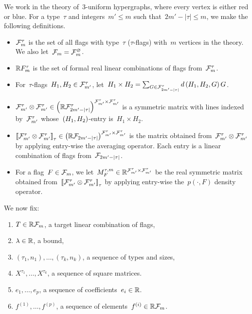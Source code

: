 \documentclass[11pt,a4paper,reqno]{amsart}
\begin{document}
We work in the theory of~$3$-uniform hypergraphs, where every vertex is either red or
blue. For a type~$\tau$ and integers~$m' \leq m$ such
that~$2m' - \left|\tau\right| \leq m$, we make the following definitions.
\begin{itemize}
\item ${\mathcal F}_m^\tau$ is the set of all flags with type~$\tau$ ($\tau$-flags) with~$m$ vertices in
  the theory. We also let~${\mathcal F}_m = {\mathcal F}_m^\varnothing$.
\item ${\mathbb R} F_m^\tau$ is the set of formal real linear combinations of flags
  from~${\mathcal F}_m^{\tau}$.
\item For~$\tau$-flags~$H_1, H_2 \in {\mathcal F}_{m'}^{\tau}$,
  let~$H_1 \times H_2 = \sum_{G \in {\mathcal F}_{2m' - \left| \tau \right|}^\tau} d\left(H_1, H_2, G\right) G$.
\item
  ${\mathcal F}_{m'}^{\tau} \otimes {\mathcal F}_{m'}^{\tau} \in \left({\mathbb R} {\mathcal F}_{2m' -
      \left|\tau\right|}^\tau\right)^{{\mathcal F}_{m'}^\tau \times {\mathcal F}_{m'}^\tau}$ is a symmetric matrix with lines
  indexed by~${\mathcal F}_{m'}^{\tau}$ whose~$\left(H_1, H_2\right)$-entry is~$H_1 \times H_2$.
\item
  $\left\llbracket {\mathcal F}_{m'}^{\tau} \otimes {\mathcal F}_{m'}^{\tau} \right\rrbracket_{\tau} \in \left({\mathbb R} {\mathcal F}_{2m' -
      \left|\tau\right|}\right)^{{\mathcal F}_{m'}^\tau \times {\mathcal F}_{m'}^\tau}$ is the matrix obtained
  from~${\mathcal F}_{m'}^{\tau} \otimes {\mathcal F}_{m'}^{\tau}$ by applying entry-wise the averaging
  operator. Each entry is a linear combination of flags
  from~${\mathcal F}_{2m' - \left|\tau\right|}$.
\item For a flag~$F \in {\mathcal F}_m$, we
  let~$M_F^{\tau, m} \in {\mathbb R}^{{\mathcal F}_{m'}^\tau \times {\mathcal F}_{m'}^\tau}$ be the real symmetric matrix
  obtained from~$\left\llbracket {\mathcal F}_{m'}^{\tau} \otimes {\mathcal F}_{m'}^{\tau} \right\rrbracket_{\tau}$ by applying
  entry-wise the~$p(\cdot, F)$ density operator.
\end{itemize}
We now fix:
\begin{enumerate}[label=(\textit{\roman*})]
\item\label{item:target} $T \in {\mathbb R}{\mathcal F}_m$, a target linear combination of flags,
\item\label{item:result} $\lambda \in {\mathbb R}$, a bound,
\item\label{item:types} $(\tau_1, n_1), \dots, (\tau_k, n_k)$, a sequence of types and sizes,
\item\label{item:matrices} $X^{\tau_1}, \dots, X^{\tau_k}$, a sequence of square matrices.
\item\label{item:e_vector} $e_1, \dots, e_p$, a sequence of coefficients~$e_i \in {\mathbb R}$.
\item\label{item:positives} $f^{(1)}, \dots, f^{(p)}$, a sequence of elements~$f^{(i)} \in {\mathbb R}{\mathcal F}_m$.
\end{enumerate}
\end{document}
